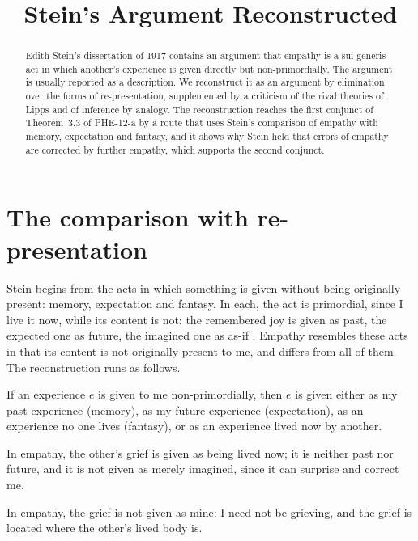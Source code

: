 \documentclass{situationist-preprint}
\title{Stein's Argument Reconstructed}
\begin{document}
\maketitle

\begin{abstract}
Edith Stein's dissertation of 1917 contains an argument that empathy is a sui generis act in which another's experience is given directly but non-primordially. The argument is usually reported as a description. We reconstruct it as an argument by elimination over the forms of re-presentation, supplemented by a criticism of the rival theories of Lipps and of inference by analogy. The reconstruction reaches the first conjunct of Theorem~3.3 of PHE-12-a by a route that uses Stein's comparison of empathy with memory, expectation and fantasy, and it shows why Stein held that errors of empathy are corrected by further empathy, which supports the second conjunct.
\end{abstract}

\section{The comparison with re-presentation}

Stein begins from the acts in which something is given without being originally present: memory, expectation and fantasy. In each, the act is primordial, since I live it now, while its content is not: the remembered joy is given as past, the expected one as future, the imagined one as as-if \citep[ch.~2]{Stein1917}. Empathy resembles these acts in that its content is not originally present to me, and differs from all of them. The reconstruction runs as follows.

\begin{assumption}\label{a:forms}
If an experience $e$ is given to me non-primordially, then $e$ is given either as my past experience (memory), as my future experience (expectation), as an experience no one lives (fantasy), or as an experience lived now by another.
\end{assumption}

\begin{assumption}\label{a:present}
In empathy, the other's grief is given as being lived now; it is neither past nor future, and it is not given as merely imagined, since it can surprise and correct me.
\end{assumption}

\begin{assumption}\label{a:notmine}
In empathy, the grief is not given as mine: I need not be grieving, and the grief is located where the other's lived body is.
\end{assumption}
\end{document}
